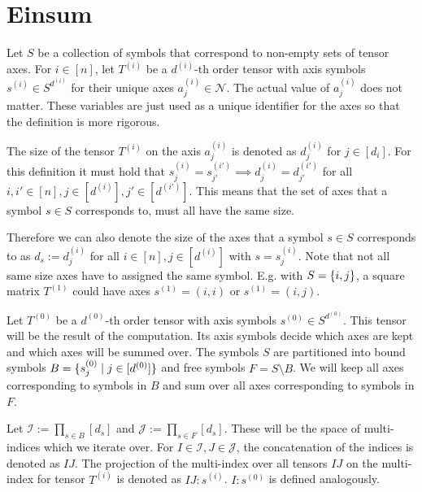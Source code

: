 \section{Einsum}
\begin{definition}
    Let $S$ be a collection of symbols that correspond to non-empty sets of tensor axes.
    For $i \in [n]$, let $T^{(i)}$ be a $d^{(i)}$-th order tensor with axis symbols $s^{(i)} \in S^{d^{(i)}}$ for their unique axes $a^{(i)}_j \in \mathcal{N}$.
    The actual value of $a^{(i)}_j$ does not matter. These variables are just used as a unique identifier for the axes so that the definition is more rigorous.

    The size of the tensor $T^{(i)}$ on the axis $a^{(i)}_j$ is denoted as $d^{(i)}_j$ for $j \in [d_i]$.
    For this definition it must hold that $s^{(i)}_j = s^{(i')}_{j'} \implies d^{(i)}_j = d^{(i')}_{j'}$ for all $i,i' \in [n], j \in [d^{(i)}], j' \in [d^{(i')}]$.
    This means that the set of axes that a symbol $s \in S$ corresponds to, must all have the same size.

    Therefore we can also denote the size of the axes that a symbol $s \in S$ corresponds to as $d_s := d^{(i)}_j$ for all $i \in [n], j \in [d^{(i)}]$ with $s = s^{(i)}_j$.
    Note that not all same size axes have to assigned the same symbol. E.g. with $S = \left\lbrace i,j \right\rbrace$, a square matrix $T^{(1)}$ could have axes $s^{(1)} = (i, i)$ or $s^{(1)} = (i, j)$.

    Let $T^{(0)}$ be a $d^{(0)}$-th order tensor with axis symbols $s^{(0)} \in S^{d^{(0)}}$.
    This tensor will be the result of the computation.
    Its axis symbols decide which axes are kept and which axes will be summed over.
    The symbols $S$ are partitioned into bound symbols $B = \lbrace s^{(0)}_j \mid j \in [d^{(0)}] \rbrace$ and  free symbols $F = S \setminus B$.
    We will keep all axes corresponding to symbols in $B$ and sum over all axes corresponding to symbols in $F$.

    Let $\mathcal{I} := \prod_{s \in B} [d_s]$ and $\mathcal{J} := \prod_{s \in F} [d_s]$.
    These will be the space of multi-indices which we iterate over.
    For $I \in \mathcal{I}, J \in \mathcal{J}$, the concatenation of the indices is denoted as $IJ$.
    The projection of the multi-index over all tensors $IJ$ on the multi-index for tensor $T^{(i)}$ is denoted as $IJ:s^{(i)}$.
    $I:s^{(0)}$ is defined analogously.


\end{definition}
